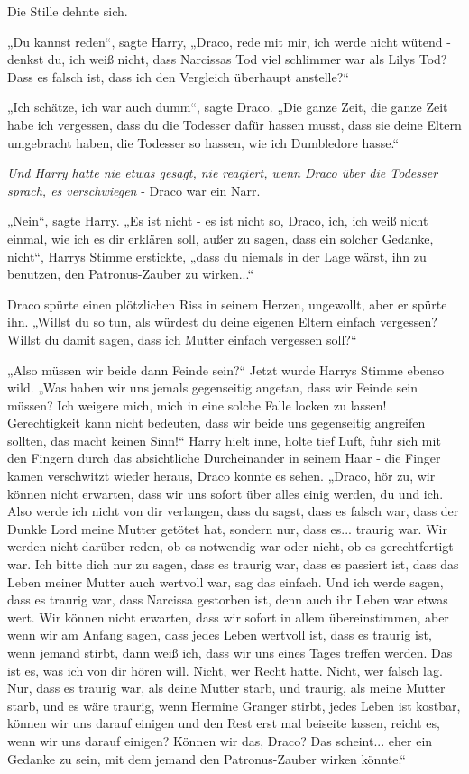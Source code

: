 {Die Stille dehnte sich.

„Du kannst reden“, sagte Harry, „Draco, rede mit mir, ich werde nicht wütend - denkst du, ich weiß nicht, dass Narcissas Tod viel schlimmer war als Lilys Tod? Dass es falsch ist, dass ich den Vergleich überhaupt anstelle?“

„Ich schätze, ich war auch dumm“, sagte Draco. „Die ganze Zeit, die ganze Zeit habe ich vergessen, dass du die Todesser dafür hassen musst, dass sie deine Eltern umgebracht haben, die Todesser so hassen, wie ich Dumbledore hasse.“

\emph{Und Harry hatte nie etwas gesagt, nie reagiert, wenn Draco über die Todesser sprach, es verschwiegen} - Draco war ein Narr.

„Nein“, sagte Harry. „Es ist nicht - es ist nicht so, Draco, ich, ich weiß nicht einmal, wie ich es dir erklären soll, außer zu sagen, dass ein solcher Gedanke, nicht“, Harrys Stimme erstickte, „dass du niemals in der Lage wärst, ihn zu benutzen, den Patronus-Zauber zu wirken...“

Draco spürte einen plötzlichen Riss in seinem Herzen, ungewollt, aber er spürte ihn. „Willst du so tun, als würdest du deine eigenen Eltern einfach vergessen? Willst du damit sagen, dass ich Mutter einfach vergessen soll?“

„Also müssen wir beide dann Feinde sein?“ Jetzt wurde Harrys Stimme ebenso wild. „Was haben wir uns jemals gegenseitig angetan, dass wir Feinde sein müssen? Ich weigere mich, mich in eine solche Falle locken zu lassen! Gerechtigkeit kann nicht bedeuten, dass wir beide uns gegenseitig angreifen sollten, das macht keinen Sinn!“ Harry hielt inne, holte tief Luft, fuhr sich mit den Fingern durch das absichtliche Durcheinander in seinem Haar - die Finger kamen verschwitzt wieder heraus, Draco konnte es sehen. „Draco, hör zu, wir können nicht erwarten, dass wir uns sofort über alles einig werden, du und ich. Also werde ich nicht von dir verlangen, dass du sagst, dass es falsch war, dass der Dunkle Lord meine Mutter getötet hat, sondern nur, dass es... traurig war. Wir werden nicht darüber reden, ob es notwendig war oder nicht, ob es gerechtfertigt war. Ich bitte dich nur zu sagen, dass es traurig war, dass es passiert ist, dass das Leben meiner Mutter auch wertvoll war, sag das einfach. Und ich werde sagen, dass es traurig war, dass Narcissa gestorben ist, denn auch ihr Leben war etwas wert. Wir können nicht erwarten, dass wir sofort in allem übereinstimmen, aber wenn wir am Anfang sagen, dass jedes Leben wertvoll ist, dass es traurig ist, wenn jemand stirbt, dann weiß ich, dass wir uns eines Tages treffen werden. Das ist es, was ich von dir hören will. Nicht, wer Recht hatte. Nicht, wer falsch lag. Nur, dass es traurig war, als deine Mutter starb, und traurig, als meine Mutter starb, und es wäre traurig, wenn Hermine Granger stirbt, jedes Leben ist kostbar, können wir uns darauf einigen und den Rest erst mal beiseite lassen, reicht es, wenn wir uns darauf einigen? Können wir das, Draco? Das scheint... eher ein Gedanke zu sein, mit dem jemand den Patronus-Zauber wirken könnte.“

}
